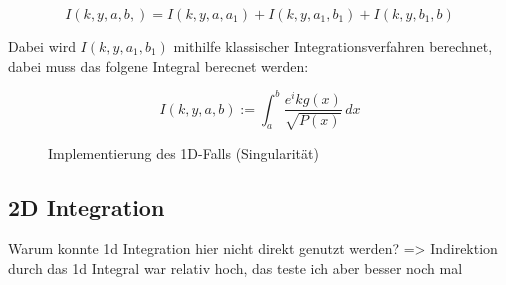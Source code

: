 \begin{equation}
    I(k,y,a,b,) = I(k,y,a,a_1) + I(k,y,a_1, b_1) + I(k,y,b_1,b)
\end{equation}

Dabei wird $I(k,y,a_1, b_1)$ mithilfe klassischer Integrationsverfahren berechnet, dabei muss das folgene Integral berecnet werden:

\begin{equation}
    I(k,y,a,b) := \int_{a}^{b}  \frac{e^ikg(x)}{\sqrt{P(x)}} \,dx 
\end{equation}

\begin{figure}
    
    \caption{Implementierung des 1D-Falls (Singularität)}
\end{figure}


\subsection{2D Integration}

Warum konnte 1d Integration hier nicht direkt genutzt werden?
=> Indirektion durch das 1d Integral war relativ hoch, das teste ich aber besser noch mal